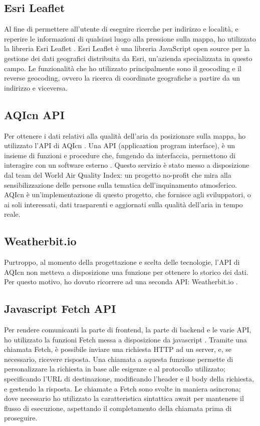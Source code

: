 \subsection{Esri Leaflet}
Al fine di permettere all'utente di eseguire ricerche per indirizzo e località, e reperire le informazioni di qualsiasi luogo alla pressione sulla mappa, ho utilizzato la libreria Esri Leaflet \cite{esri}.
Esri Leaflet è una libreria JavaScript open source per la gestione dei dati geografici distribuita da Esri, un'azienda specializzata in questo campo.
Le funzionalità che ho utilizzato principalmente sono il geocoding e il reverse geocoding, ovvero la ricerca di coordinate geografiche a partire da un indirizzo e viceversa.

\subsection{AQIcn API}
Per ottenere i dati relativi alla qualità dell'aria da posizionare sulla mappa, ho utilizzato l'API di AQIcn \cite{aqicn}.
Una API (applicaztion program interface), è un insieme di funzioni e procedure che, fungendo da interfaccia, permettono di interagire con un software esterno \cite{api}.
Questo servizio è stato messo a disposizione dal team del World Air Quality Index: un progetto no-profit che mira alla sensibilizzazione delle persone sulla tematica dell'inquinamento atmosferico.
AQIcn è un'implementazione di questo progetto, che fornisce agli sviluppatori, o ai soli interessati, dati trasparenti e aggiornati sulla qualità dell'aria in tempo reale.

\subsection{Weatherbit.io}
Purtroppo, al momento della progettazione e scelta delle tecnologie, l'API di AQIcn non metteva a disposizione una funzione per ottenere lo storico dei dati.
Per questo motivo, ho dovuto ricorrere ad una seconda API: Weatherbit.io \cite{weatherbitio}.

\subsection{Javascript Fetch API}
Per rendere comunicanti la parte di frontend, la parte di backend e le varie API, ho utilizzato la funzioni Fetch messa a disposizione da javascript \cite{javascript}.
Tramite una chiamata Fetch, è possibile inviare una richiesta HTTP ad un server, e, se necessario, ricevere risposta.
Una chiamata a aquesta funzione permette di personalizzare la richiesta in base alle esigenze e al protocollo utilizzato; specificando l'URL di destinazione, modificando l'header e il body della richiesta, e gestendo la risposta.
Le chiamate a Fetch sono svolte in maniera asincrona; dove necessario ho utilizzato la caratteristica sintattica await per mantenere il flusso di esecuzione, aspettando il completamento della chiamata prima di proseguire.

